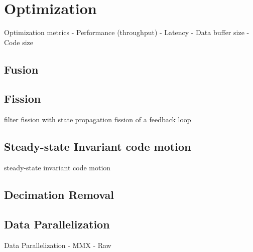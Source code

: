 \section{Optimization}

Optimization metrics
-	Performance (throughput) 
-	Latency
-	Data buffer size
-	Code size

\subsection{Fusion}

\subsection{Fission}

filter fission with state propagation
fission of a feedback loop

\subsection{Steady-state Invariant code motion}

steady-state invariant code motion

\subsection{Decimation Removal}

\subsection{Data Parallelization}

Data Parallelization
-	MMX
-	Raw

